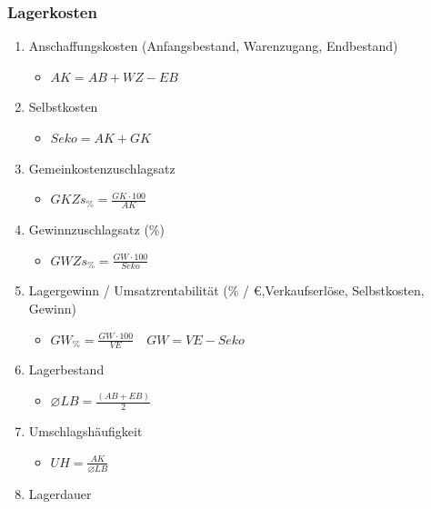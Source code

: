 \newpage

\subsubsection{Lagerkosten}\label{lagerkosten}

\begin{enumerate}
\item
  Anschaffungskosten (Anfangsbestand, Warenzugang, Endbestand)

  \begin{itemize}
  \item
    $\boxed{AK = AB + WZ - EB}$
  \end{itemize}
\item
  Selbstkosten

  \begin{itemize}
  \item
    $\boxed{Seko = AK + GK}$
  \end{itemize}
\item
  Gemeinkostenzuschlagsatz

  \begin{itemize}
  \item
    $\boxed{GKZs_\% = \frac{GK \cdot 100}{AK}}$
  \end{itemize}
\item
  Gewinnzuschlagsatz (\%)

  \begin{itemize}
  \item
    $\boxed{GWZs_\% = \frac{GW \cdot 100}{Seko}}$
  \end{itemize}
\item
  Lagergewinn / Umsatzrentabilität (\% / €,Verkaufserlöse, Selbstkosten,
  Gewinn)

  \begin{itemize}
  \item
    $\boxed{GW_\% = \frac{GW \cdot 100}{VE}} \quad \boxed{GW = VE - Seko}$
  \end{itemize}
\item
  Lagerbestand

  \begin{itemize}
  \item
    $\boxed{\varnothing LB = \frac{(AB + EB)}{2}}$
  \end{itemize}
\item
  Umschlagshäufigkeit

  \begin{itemize}
  \item
    $\boxed{UH = \frac{AK}{\varnothing LB}}$
  \end{itemize}
\item
  Lagerdauer


\end{enumerate}
